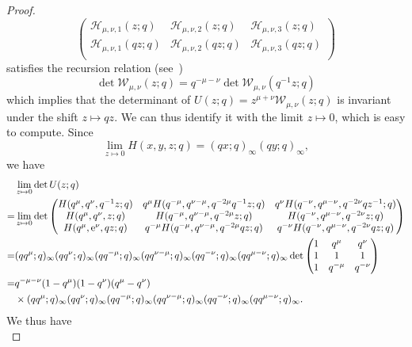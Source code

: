 \documentclass[12pt,reqno]{amsart}
\theoremstyle{definition}
\def\re{{\rm e}}
\def\cH{\mathcal{H}}
\def\cW{\mathcal{W}}
\newcommand{\nn}{\nonumber \\}
\begin{document}
\begin{proof}
\begin{equation}
\begin{pmatrix}
      \cH_{\mu,\nu,1}(z;q) & \cH_{\mu,\nu,2}(z;q)
      & \cH_{\mu,\nu,3}(z;q)\\
      \cH_{\mu,\nu,1}(q z;q) & \cH_{\mu,\nu,2}(q z;q)
      & \cH_{\mu,\nu,3}(q z;q)\\
    \end{pmatrix}
  \end{equation}
  satisfies the recursion relation (see~\cite[Lem.4.7]{GK:74})
  \begin{equation}
    \det \cW_{\mu,\nu}(z;q) = q^{-\mu-\nu} \det\cW_{\mu,\nu}(q^{-1}z;q)
  \end{equation}
  which implies that the determinant of
  $U(z;q) = z^{\mu+\nu} \cW_{\mu,\nu}(z;q)$ is invariant under the shift
  $z\mapsto q z$.  We can thus identify it with the limit
  $z\mapsto 0$, which is easy to compute.
  Since
  \begin{equation}
    \lim_{z\mapsto 0} H(x,y,z;q) = (qx;q)_\infty(qy;q)_\infty,
  \end{equation}
  we have
  \begin{align}
    &\lim_{z\mapsto 0} \det U(z;q) \nn=
    &\lim_{z\mapsto 0}
      \det \begin{pmatrix}
        H(q^{\mu},q^{\nu},q^{-1}z;q) &
        q^{\mu}H(q^{-\mu},q^{\nu-\mu},q^{-2\mu}q^{-1}z;q) &
        q^{\nu}H(q^{-\nu},q^{\mu-\nu},q^{-2\nu}q z^{-1};q)\\
        H(q^{\mu},q^{\nu},z;q) &
        H(q^{-\mu},q^{\nu-\mu},q^{-2\mu}z;q) &
        H(q^{-\nu},q^{\mu-\nu},q^{-2\nu}z;q)\\
        H(q^{\mu},\re^{\nu},q z;q) &
        q^{-\mu}H(q^{-\mu},q^{\nu-\mu},q^{-2\mu}q z;q) &
        q^{-\nu}H(q^{-\nu},q^{\mu-\nu},q^{-2\nu}q z;q)
    \end{pmatrix}\nn=
    &(q q^{\mu};q)_\infty(q q^{\nu};q)_\infty
     (q q^{-\mu};q)_\infty(q q^{\nu-\mu};q)_\infty
     (q q^{-\nu};q)_\infty(q q^{\mu-\nu};q)_\infty
      \det
      \begin{pmatrix}
        1&q^\mu&q^\nu\\
        1&1&1\\
        1&q^{-\mu}&q^{-\nu}\\
      \end{pmatrix}\nn=
    &q^{-\mu-\nu}(1-q^\mu)(1-q^\nu)(q^\mu-q^\nu)\nn
    &\times(q q^{\mu};q)_\infty(q q^{\nu};q)_\infty
     (q q^{-\mu};q)_\infty(q q^{\nu-\mu};q)_\infty
     (q q^{-\nu};q)_\infty(q q^{\mu-\nu};q)_\infty.
    \label{eq:detU52}
  \end{align}
  We thus have
  \begin{equation}

\end{equation}
\end{proof}
\end{document}
